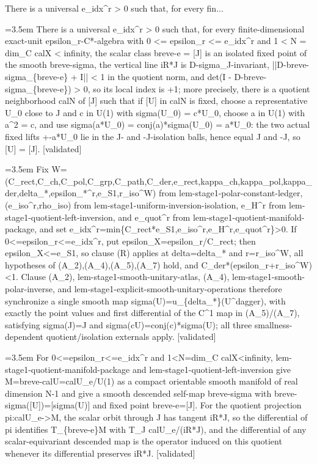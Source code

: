 \documentclass{article}
\newcommand{\step}[1]{\par\noindent\hangindent=3.5em\hangafter=1%
  \makebox[3.5em][l]{\textbf{#1.}}}
\newcommand{\steptag}[1]{\hfill{\small\textsf{[#1]}}}
\begin{document}
\begin{proofbox}{There is a universal e\_idx\textasciicircum{}r > 0 such that, for every fin...}
\step{1} There is a universal e\_idx\textasciicircum{}r > 0 such that, for every finite-dimensional exact-unit epsilon\_r-C*-algebra with 0 <= epsilon\_r <= e\_idx\textasciicircum{}r and 1 < N = dim\_C calX < infinity, the scalar class breve-e = [J] is an isolated fixed point of the smooth breve-sigma, the vertical line iR*J is D-sigma\_J-invariant, ||D-breve-sigma\_\{breve-e\} + I|| < 1 in the quotient norm, and det(I - D-breve-sigma\_\{breve-e\}) > 0, so its local index is +1; more precisely, there is a quotient neighborhood calN of [J] such that if [U] in calN is fixed, choose a representative U\_0 close to J and c in U(1) with sigma(U\_0) = c*U\_0, choose a in U(1) with a\textasciicircum{}2 = c, and use sigma(a*U\_0) = conj(a)*sigma(U\_0) = a*U\_0: the two actual fixed lifts +-a*U\_0 lie in the J- and -J-isolation balls, hence equal J and -J, so [U] = [J]. \steptag{validated} \\[6pt]
\step{1.1} Fix W=(C\_rect,C\_ch,C\_pol,C\_grp,C\_path,C\_der,e\_rect,kappa\_ch,kappa\_pol,kappa\_der,delta\_*,epsilon\_*\textasciicircum{}r,e\_S1,r\_iso\textasciicircum{}W) from lem-stage1-polar-constant-ledger, (e\_iso\textasciicircum{}r,rho\_iso) from lem-stage1-uniform-inversion-isolation, e\_H\textasciicircum{}r from lem-stage1-quotient-left-inversion, and e\_quot\textasciicircum{}r from lem-stage1-quotient-manifold-package, and set e\_idx\textasciicircum{}r=min\{C\_rect*e\_S1,e\_iso\textasciicircum{}r,e\_H\textasciicircum{}r,e\_quot\textasciicircum{}r\}>0. If 0<=epsilon\_r<=e\_idx\textasciicircum{}r, put epsilon\_X=epsilon\_r/C\_rect; then epsilon\_X<=e\_S1, so clause (R) applies at delta=delta\_* and r=r\_iso\textasciicircum{}W, all hypotheses of (A\_2),(A\_4),(A\_5),(A\_7) hold, and C\_der*(epsilon\_r+r\_iso\textasciicircum{}W)<1. Clause (A\_2), lem-stage1-smooth-unitary-atlas, (A\_4), lem-stage1-smooth-polar-inverse, and lem-stage1-explicit-smooth-unitary-operations therefore synchronize a single smooth map sigma(U)=u\_\{delta\_*\}(U\textasciicircum{}dagger), with exactly the point values and first differential of the C\textasciicircum{}1 map in (A\_5)/(A\_7), satisfying sigma(J)=J and sigma(cU)=conj(c)*sigma(U); all three smallness-dependent quotient/isolation externals apply. \steptag{validated} \\[4pt]
\step{1.2} For 0<=epsilon\_r<=e\_idx\textasciicircum{}r and 1<N=dim\_C calX<infinity, lem-stage1-quotient-manifold-package and lem-stage1-quotient-left-inversion give M=breve-calU=calU\_e/U(1) as a compact orientable smooth manifold of real dimension N-1 and give a smooth descended self-map breve-sigma with breve-sigma([U])=[sigma(U)] and fixed point breve-e=[J]. For the quotient projection pi:calU\_e->M, the scalar orbit through J has tangent iR*J, so the differential of pi identifies T\_\{breve-e\}M with T\_J calU\_e/(iR*J), and the differential of any scalar-equivariant descended map is the operator induced on this quotient whenever its differential preserves iR*J. \steptag{validated} \\[6pt]

\end{proofbox}
\end{document}

